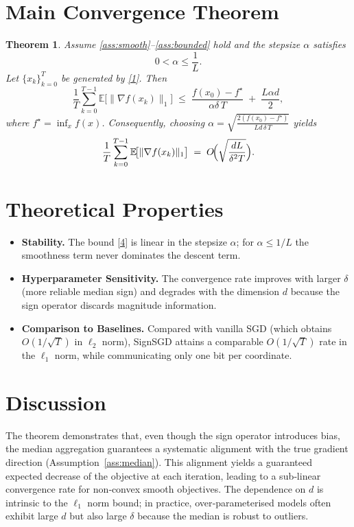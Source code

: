 \documentclass{article}
\newtheorem{theorem}{Theorem}
\newcommand{\E}{\mathbb{E}}
\begin{document}
\section*{Main Convergence Theorem}
\begin{theorem}\label{thm:main}
Assume \ref{ass:smooth}–\ref{ass:bounded} hold and the stepsize $\alpha$ satisfies
\[
0<\alpha\le\frac{1}{L}.
\]
Let $\{x_{k}\}_{k=0}^{T}$ be generated by \eqref{1}. Then
\[
\frac{1}{T}\sum_{k=0}^{T-1}\E\!\bigl[\|\nabla f(x_{k})\|_{1}\bigr]
\;\le\;
\frac{f(x_{0})-f^{\star}}{\alpha\delta\,T}
\;+\;
\frac{L\alpha d}{2},
\tag{4}
\]
where $f^{\star}=\inf_{x}f(x)$. Consequently, choosing $\alpha=\sqrt{\frac{2(f(x_{0})-f^{\star})}{L d\,\delta\,T}}$ yields
\[
\frac{1}{T}\sum_{k=0}^{T-1}\E\!\bigl[\|\nabla f(x_{k})\|_{1}\bigr]
\;=\;O\!\Bigl(\sqrt{\frac{dL}{\delta^{2}T}}\Bigr).
\]
\end{theorem}

\section*{Theoretical Properties}
\begin{itemize}[leftmargin=*]
\item \textbf{Stability.} The bound \eqref{4} is linear in the stepsize $\alpha$; for $\alpha\le 1/L$ the smoothness term never dominates the descent term.
\item \textbf{Hyperparameter Sensitivity.} The convergence rate improves with larger $\delta$ (more reliable median sign) and degrades with the dimension $d$ because the sign operator discards magnitude information.
\item \textbf{Comparison to Baselines.} Compared with vanilla SGD (which obtains $O(1/\sqrt{T})$ in $\ell_{2}$ norm), SignSGD attains a comparable $O(1/\sqrt{T})$ rate in the $\ell_{1}$ norm, while communicating only one bit per coordinate.
\end{itemize}

\section*{Discussion}
The theorem demonstrates that, even though the sign operator introduces bias, the median aggregation guarantees a systematic alignment with the true gradient direction (Assumption~\ref{ass:median}). This alignment yields a guaranteed expected decrease of the objective at each iteration, leading to a sub‑linear convergence rate for non‑convex smooth objectives. The dependence on $d$ is intrinsic to the $\ell_{1}$ norm bound; in practice, over‑parameterised models often exhibit large $d$ but also large $\delta$ because the median is robust to outliers.
\end{document}
